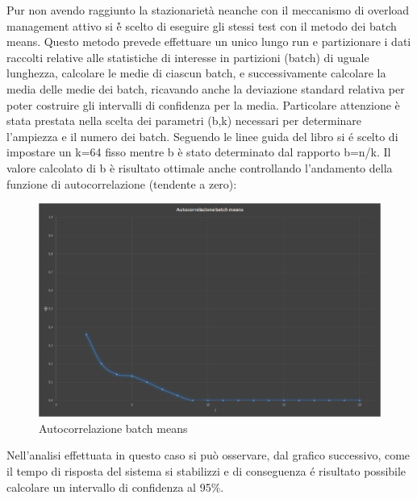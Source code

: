 Pur non avendo raggiunto la stazionariet\`a neanche con il meccanismo di overload
management attivo si \'è scelto di eseguire gli stessi test con il metodo dei batch
means. Questo metodo prevede effettuare un unico lungo run e partizionare i dati raccolti relative 
alle statistiche di interesse in partizioni (batch) di uguale lunghezza, calcolare le medie di 
ciascun batch, e successivamente calcolare la media delle medie dei batch, ricavando 
anche la deviazione standard relativa per poter costruire gli intervalli di confidenza per la 
media. Particolare attenzione è stata prestata nella scelta dei parametri (b,k) necessari per 
determinare l’ampiezza e il numero dei batch. Seguendo le linee guida del libro si \'e scelto 
di impostare un k=64 fisso mentre b è stato determinato dal rapporto b=n/k.
Il valore calcolato di b è risultato ottimale anche controllando l’andamento della funzione di 
autocorrelazione (tendente a zero):

\begin{figure}[H]
 \centering
 \includegraphics[scale=0.45]{img/autocorrBM.png}
 \caption[Autocorrelazione batch means]{Autocorrelazione batch means}
 \label{fig:Autocorrelazione batch means}
\end{figure}

Nell'analisi effettuata in questo caso si può osservare, dal grafico successivo, come il tempo
di risposta del sistema si stabilizzi e di conseguenza \'e risultato possibile calcolare un intervallo
di confidenza al 95\%. 

